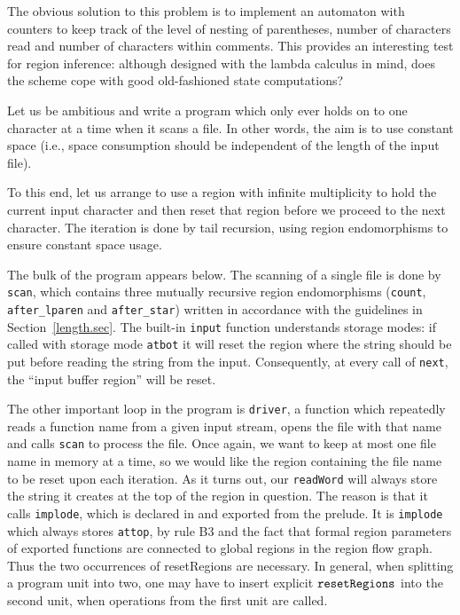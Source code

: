 \documentclass[12pt]{book}
\begin{document}
The obvious solution to this problem is to implement an
automaton with counters to keep track of the level
of nesting of parentheses, number of characters read and
number of characters within comments. This provides an interesting test
for region inference: although designed with the lambda calculus
in mind, does the scheme cope with good old-fashioned state
computations? 

Let us be ambitious and write a program which only ever holds on to one character at a
time when it scans a file. In other words, the aim is to use constant space (i.e., space
consumption should be independent of the length of the input file).

To this end, let us arrange to use a region with infinite multiplicity to
hold the current input character and then reset that region before we proceed
to the next character. The iteration is done by tail recursion, using region
endomorphisms to ensure constant space usage.

The bulk of the program appears below. The scanning of a single
file is done by {\tt scan}, which contains three mutually recursive
region endomorphisms ({\tt count}, {\tt after\_lparen} and
{\tt after\_star}) written in accordance with the guidelines
in Section~\ref{length.sec}. The built-in {\tt input} function understands
storage modes: if called with storage mode {\tt atbot} it will reset the region
where the string should be put before reading the string from the input.
Consequently, at every call of {\tt next}, the ``input buffer region'' will be reset.

The other important loop in the program is {\tt driver}, a function which
repeatedly reads a function name from a given input stream, opens the file
with that name and calls {\tt scan} to process the file. Once again, we
want to keep at most one file name in memory at a time, so we would like
the region containing the file name to be reset upon each iteration.
As it turns out, our {\tt readWord} will always store the string it
creates at the top of the region in question. The reason is that
it calls {\tt implode}, which is declared in and exported from 
the prelude. It is {\tt implode} which always stores {\tt attop}, by
rule B3 and the fact that formal region parameters of exported functions
are connected to global regions in the region flow graph. 
Thus the two occurrences of resetRegions are necessary. In general,
when splitting a program unit into two, one may have 
to insert explicit $\hbox{\tt resetRegions}$ into the second unit, when operations from the
first unit are called. 
\end{document}

